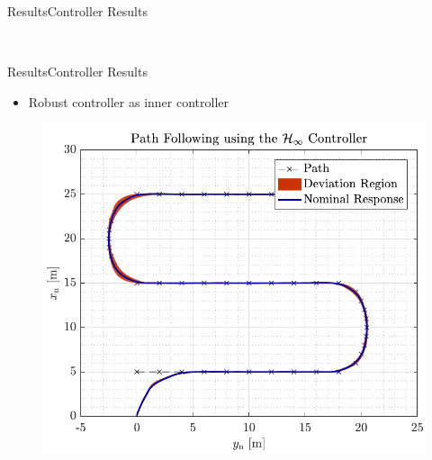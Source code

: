 \begin{frame}{Results}{Controller Results}
\begin{minipage}{0.45\linewidth}
\begin{figure}[H]
            \end{figure}               
        \end{minipage}\hfill \\    
\end{frame}

\begin{frame}{Results}{Controller Results}
    \begin{itemize}
        \item Robust controller as inner controller
    \end{itemize}
    \begin{minipage}{0.45\linewidth}
            \begin{figure}[H]
                \centering
                \includegraphics[width=1\linewidth]{figures/path_rob}
            \end{figure}       
        \end{minipage}\hfill      
    \begin{minipage}{0.45\linewidth}
            \begin{figure}[H]
                \centering

\end{figure}
\end{minipage}
\end{frame}
